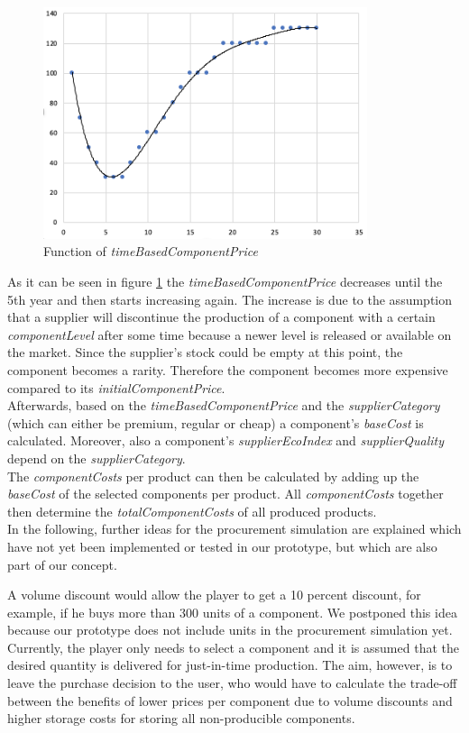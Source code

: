 \begin{figure} [H]
    \centering
	\includegraphics[width=9.5cm]{images/timeBasedComponentFunction.png}
	\caption{Function of \textit{timeBasedComponentPrice}}
	\label{img:timeBasedComponentPriceFunction}
\end{figure}
As it can be seen in figure \ref{img:timeBasedComponentPriceFunction} the \textit{timeBasedComponentPrice} decreases until the 5th year and then starts increasing again. The increase is due to the assumption that a supplier will discontinue the production of a component with a certain \textit{componentLevel} after some time because a newer level is released or available on the market. Since the supplier’s stock could be empty at this point, the component becomes a rarity. Therefore the component becomes more expensive compared to its \textit{initialComponentPrice}.\\
Afterwards, based on the \textit{timeBasedComponentPrice} and the \textit{supplierCategory} (which can either be premium, regular or cheap) a component's \textit{baseCost} is calculated. Moreover, also a component's \textit{supplierEcoIndex} and \textit{supplierQuality} depend on the \textit{supplierCategory}.\\
The \textit{componentCosts} per product can then be calculated by adding up the \textit{baseCost} of the selected components per product. All \textit{componentCosts} together then determine the \textit{totalComponentCosts} of all produced products.\\

In the following, further ideas for the procurement simulation are explained which have not yet been implemented or tested in our prototype, but which are also part of our concept.

A volume discount would allow the player to get a 10 percent discount, for example, if he buys more than 300 units of a component. We postponed this idea because our prototype does not include units in the procurement simulation yet. Currently, the player only needs to select a component and it is assumed that the desired quantity is delivered for just-in-time production. 
The aim, however, is to leave the purchase decision to the user, who would have to calculate the trade-off between the benefits of lower prices per component due to volume discounts and higher storage costs for storing all non-producible components.